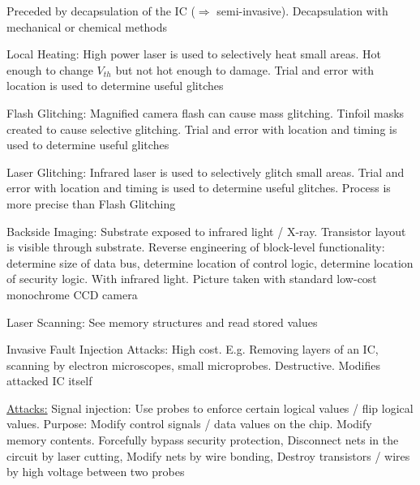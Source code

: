 \documentclass[landscape, a4paper]{article}
\begin{document}
\begin{minipage}[t]{0.2\linewidth}
\begin{betterlist}
\begin{betterlist}
			\item Preceded by decapsulation of the IC ($\Rightarrow$ semi-invasive). Decapsulation with \alert{mechanical} or \alert{chemical} methods
			\item \alert{Local Heating:}  High power laser is used to selectively heat small areas. Hot enough to change $V_{th}$ but not hot enough to damage. Trial and error with location is used to determine useful glitches
			\item \alert{Flash Glitching:} Magnified camera flash can cause mass glitching. Tinfoil masks created to cause selective glitching. Trial and error with location and timing is used to determine useful glitches
			\item \alert{Laser Glitching:} Infrared laser is used to selectively glitch small areas. Trial and error with location and timing is used to determine useful glitches. Process is more precise than Flash Glitching
			\item \alert{Backside Imaging:} Substrate exposed to infrared light / X-ray. Transistor layout is visible through substrate. Reverse engineering of block-level functionality: determine size of data bus, determine location of control logic, determine location of security logic. With infrared light. Picture taken with standard low-cost monochrome CCD camera
			\item \alert{Laser Scanning:} See memory structures and read stored values
		\end{betterlist}
		\item \alert{Invasive Fault Injection Attacks:} High cost. E.g. Removing layers of an IC, scanning by electron microscopes, small microprobes. Destructive. Modifies attacked IC itself
		\begin{betterlist}
			\item \underline{Attacks:} \alert{Signal injection:} Use probes to enforce certain logical values / flip logical values. Purpose: Modify control signals / data values on the chip. Modify memory contents. Forcefully bypass security protection, \alert{Disconnect nets in the circuit by laser cutting}, \alert{Modify nets by wire bonding}, \alert{Destroy transistors / wires by high voltage between two probes}
		\end{betterlist}
	\end{betterlist}
\end{minipage}
\end{document}
